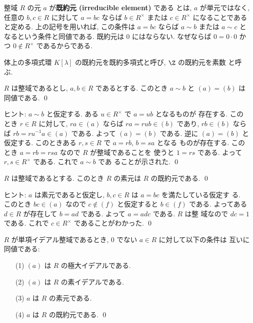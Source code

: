 \documentclass[12pt,twoside]{jarticle}
\begin{document}
整域 $R$ の元 $a$ が{\bf 既約元 (irreducible element)} である
とは, $a$ が単元ではなく, 
任意の $b,c\in R$ に対して $a=bc$ ならば $b\in R^\times$ 
または $c\in R^\times$ になることであると定める.
上の記号を用いれば, この条件は $a=bc$ ならば $a\sim b$ または $a\sim c$ と
なるという条件と同値である.
既約元は $0$ にはならない. なぜならば $0=0\cdot 0$ かつ $0\not\in R^\times$ 
であるからである.

体上の多項式環 $K[\lambda]$ の既約元を既約多項式と呼び, $\Z$ の既約元を素数
と呼ぶ.


\begin{question}
  $R$ は整域であるとし, $a,b\in R$ であるとする.
  このとき $a\sim b$ と $(a) = (b)$ は同値である.
  \qed
\end{question}

\noindent
ヒント: $a\sim b$ と仮定する. ある $u\in R^\times$ で $a=ub$ となるものが
存在する. このとき $r\in R$ に対して, $ra\in(a)$ ならば $ra=rub\in(b)$ であり, 
$rb\in(b)$ ならば $rb=ru^{-1}a\in(a)$ である.  よって $(a)=(b)$ である.
逆に $(a)=(b)$ と仮定する. このときある $r,s\in R$ で $a=rb$, $b=sa$ となる
ものが存在する.  このとき $a=rb=rsa$ なので $R$ が整域であることを
使うと $1=rs$ である. よって $r,s\in R^\times$ である. これで $a\sim b$ であ
ることが示された.
\qed


\begin{question}[素元ならば既約元]
\label{q:prime-implies-irred}
  $R$ は整域であるとする. このとき $R$ の素元は $R$ の既約元である. 
  \qed
\end{question}

\noindent
ヒント: $a$ は素元であると仮定し, $b,c\in R$ は $a=bc$ を満たしている仮定す
る.  このとき $bc\in (a)$ なので $c\not\in(f)$ と仮定すると $b\in(f)$ である.
よってある $d\in R$ が存在して $b=ad$ である. よって $a=adc$ である. $R$ は整
域なので $dc=1$ である. これで $c\in R^\times$ であることがわかった.
\qed


\begin{question}
\label{q:PID-maximal-prime}
  $R$ が単項イデアル整域であるとき, $0$ でない $a\in R$ に対して以下の条件は
  互いに同値である:
  \begin{enumerate}
  \item[(1)] $(a)$ は $R$ の極大イデアルである.
  \item[(2)] $(a)$ は $R$ の素イデアルである.
  \item[(3)] $a$ は $R$ の素元である.
  \item[(4)] $a$ は $R$ の既約元である.
    \qed
  \end{enumerate}
\end{question}
\end{document}

